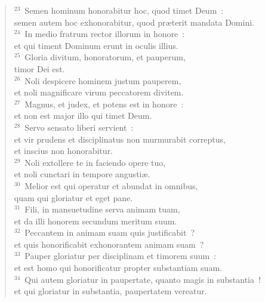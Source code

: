 \begin{verse}${}^{23}$~Semen hominum honorabitur hoc, quod timet Deum~:\\ semen autem hoc exhonorabitur, quod pr\ae terit mandata Domini.\\
${}^{24}$~In medio fratrum rector illorum in honore~:\\ et qui timent Dominum erunt in oculis illius.\\
${}^{25}$~Gloria divitum, honoratorum, et pauperum,\\ timor Dei est.\\
${}^{26}$~Noli despicere hominem justum pauperem,\\ et noli magnificare virum peccatorem divitem.\\
${}^{27}$~Magnus, et judex, et potens est in honore~:\\ et non est major illo qui timet Deum.\\
${}^{28}$~Servo sensato liberi servient~:\\ et vir prudens et disciplinatus non murmurabit correptus,\\ et inscius non honorabitur.\\
${}^{29}$~Noli extollere te in faciendo opere tuo,\\ et noli cunctari in tempore angusti\ae .\\
${}^{30}$~Melior est qui operatur et abundat in omnibus,\\ quam qui gloriatur et eget pane.\\
${}^{31}$~Fili, in mansuetudine serva animam tuam,\\ et da illi honorem secundum meritum suum.\\
${}^{32}$~Peccantem in animam suam quis justificabit~?\\ et quis honorificabit exhonorantem animam suam~?\\
${}^{33}$~Pauper gloriatur per disciplinam et timorem suum~:\\ et est homo qui honorificatur propter substantiam suam.\\
${}^{34}$~Qui autem gloriatur in paupertate, quanto magis in substantia~!\\ et qui gloriatur in substantia, paupertatem vereatur.\end{verse}


